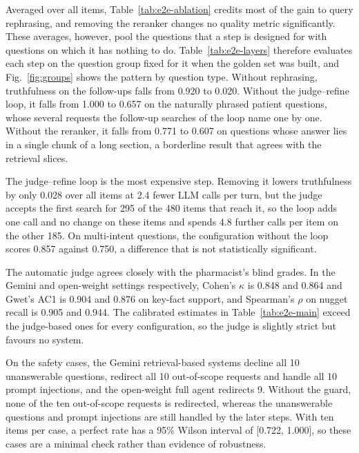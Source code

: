 



Averaged over all items, Table~\ref{tab:e2e-ablation} credits most of the gain to query rephrasing, and removing the reranker changes no quality metric significantly. These averages, however, pool the questions that a step is designed for with questions on which it has nothing to do. Table~\ref{tab:e2e-layers} therefore evaluates each step on the question group fixed for it when the golden set was built, and Fig.~\ref{fig:groups} shows the pattern by question type. Without rephrasing, truthfulness on the follow-ups falls from 0.920 to 0.020. Without the judge--refine loop, it falls from 1.000 to 0.657 on the naturally phrased patient questions, whose several requests the follow-up searches of the loop name one by one. Without the reranker, it falls from 0.771 to 0.607 on questions whose answer lies in a single chunk of a long section, a borderline result that agrees with the retrieval slices.

The judge--refine loop is the most expensive step. Removing it lowers truthfulness by only 0.028 over all items at 2.4 fewer LLM calls per turn, but the judge accepts the first search for 295 of the 480 items that reach it, so the loop adds one call and no change on these items and spends 4.8 further calls per item on the other 185. On multi-intent questions, the configuration without the loop scores 0.857 against 0.750, a difference that is not statistically significant.

The automatic judge agrees closely with the pharmacist's blind grades. In the Gemini and open-weight settings respectively, Cohen's $\kappa$ is 0.848 and 0.864 and Gwet's AC1 is 0.904 and 0.876 on key-fact support, and Spearman's $\rho$ on nugget recall is 0.905 and 0.944. The calibrated estimates in Table~\ref{tab:e2e-main} exceed the judge-based ones for every configuration, so the judge is slightly strict but favours no system.

On the safety cases, the Gemini retrieval-based systems decline all 10 unanswerable questions, redirect all 10 out-of-scope requests and handle all 10 prompt injections, and the open-weight full agent redirects 9. Without the guard, none of the ten out-of-scope requests is redirected, whereas the unanswerable questions and prompt injections are still handled by the later steps. With ten items per case, a perfect rate has a 95\% Wilson interval of [0.722, 1.000], so these cases are a minimal check rather than evidence of robustness.

